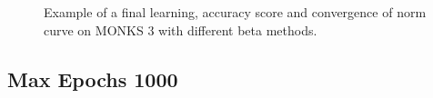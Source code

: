 \begin{appendices}
\begin{figure}[H]
\begin{subfigure}{0.40\textwidth}
                \end{subfigure}
                \begin{subfigure}{0.40\textwidth}
                    \caption{}
                    \label{fig:monks_3_NORM_CGD}
                \end{subfigure}
                \caption{Example of a final learning, accuracy score and convergence of norm curve on MONKS 3 with different beta methods.}
                \label{fig:monks_3_CGD}
            \end{figure}




            \subsection{Max Epochs 1000}


\end{appendices}
